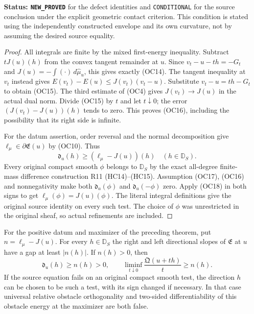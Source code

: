 \noindent\textbf{Status: \texttt{NEW\_PROVED}} for the
defect identities and \texttt{CONDITIONAL} for the source
conclusion under the explicit geometric contact criterion.
This condition is stated using the independently constructed
envelope and its own curvature, not by assuming the desired
source equality.

\begin{proof}
All integrals are finite by the mixed first-energy inequality.
Subtract $tJ(u)(h)$ from the convex tangent remainder at $u$.
Since $v_t-u-th=-G_t$ and $J(u)=-\int(\cdot)\,d\widehat\mu_u$,
this gives exactly \textup{(OC14)}.  The tangent inequality
at $v_t$ instead gives
$E(v_t)-E(u)\le J(v_t)(v_t-u)$.
Substitute $v_t-u=th-G_t$ to obtain \textup{(OC15)}.
The third estimate of \textup{(OC4)} gives
$J(v_t)\to J(u)$ in the actual dual norm.  Divide
\textup{(OC15)} by $t$ and let $t\downarrow0$; the error
$(J(v_t)-J(u))(h)$ tends to zero.  This proves
\textup{(OC16)}, including the possibility that its right
side is infinite.

For the datum assertion, order reversal and the normal
decomposition give $\ell_\mu\in\partial\mathfrak E(u)$
by \textup{(OC10)}.  Thus
\[
 \mathfrak d_u(h)\ge(\ell_\mu-J(u))(h)
                                    \quad(h\in\mathbb D_S).
 \tag{OC18}
\]
Every original compact smooth $\phi$ belongs to $\mathbb D_S$
by the exact all-degree finite-mass difference construction
R11 \textup{(HC14)--(HC15)}.  Assumption \textup{(OC17)},
\textup{(OC16)} and nonnegativity make both
$\mathfrak d_u(\phi)$ and $\mathfrak d_u(-\phi)$ zero.
Apply \textup{(OC18)} in both signs to get
$\ell_\mu(\phi)=J(u)(\phi)$.  The literal integral
definitions give the original source identity on every
such test.  The choice of $\phi$ was unrestricted in the
original sheaf, so actual refinements are included.
\end{proof}

\begin{corollary}
\label{cor:r12-normal-residual-obstacle-kink}
For the positive datum and maximizer of the preceding theorem,
put $n=\ell_\mu-J(u)$.  For every $h\in\mathbb D_S$ the
right and left directional slopes of $\mathfrak E$ at $u$
have a gap at least $|n(h)|$.  If $n(h)>0$, then
\[
 \mathfrak d_u(h)\ge n(h)>0,
 \qquad
 \liminf_{t\downarrow0}\frac{\mathfrak Q(u+th)}{t}\ge n(h).
 \tag{OC19}
\]
If the source equation fails on an original compact smooth
test, the direction $h$ can be chosen to be such a test,
with its sign changed if necessary.  In that case universal
relative obstacle orthogonality and two-sided differentiability
of this obstacle energy at the maximizer are both false.
\end{corollary}

